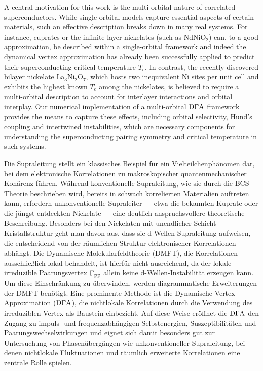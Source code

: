 \documentclass[../../main.tex]{subfiles}
\begin{document}
A central motivation for this work is the multi-orbital nature of correlated superconductors. While single-orbital models capture essential aspects of certain materials, such an effective description breaks down in many real systems. For instance, cuprates or the infinite-layer nickelates (such as NdNiO$_2$) can, to a good approximation, be described within a single-orbital framework and indeed the dynamical vertex approximation has already been successfully applied to predict their superconducting critical temperature $T_{\mathrm{c}}$. In contrast, the recently discovered bilayer nickelate La$_3$Ni$_2$O$_7$, which hosts two inequivalent Ni sites per unit cell and exhibits the highest known $T_{\mathrm{c}}$ among the nickelates, is believed to require a multi-orbital description to account for interlayer interactions and orbital interplay. Our numerical implementation of a multi-orbital $\text{D}\Gamma\text{A}$ framework provides the means to capture these effects, including orbital selectivity, Hund's coupling and intertwined instabilities, which are necessary components for understanding the superconducting pairing symmetry and critical temperature in such systems.

\newpage
{}
\vspace{1.4cm}

Die Supraleitung stellt ein klassisches Beispiel für ein Vielteilchenphänomen dar, bei dem elektronische Korrelationen zu makroskopischer quantenmechanischer Kohärenz führen. Während konventionelle Supraleitung, wie sie durch die BCS-Theorie beschrieben wird, bereits in schwach korrelierten Materialien auftreten kann, erfordern unkonventionelle Supraleiter --- etwa die bekannten Kuprate oder die jüngst entdeckten Nickelate --- eine deutlich anspruchsvollere theoretische Beschreibung. Besonders bei den Nickelaten mit unendlicher Schicht-Kristallstruktur geht man davon aus, dass sie d-Wellen-Supraleitung aufweisen, die entscheidend von der räumlichen Struktur elektronischer Korrelationen abhängt. Die Dynamische Molekularfeldtheorie (DMFT), die Korrelationen ausschließlich lokal behandelt, ist hierfür nicht ausreichend, da der lokale irreduzible Paarungsvertex $\Gamma_{\text{pp}}$ allein keine d-Wellen-Instabilität erzeugen kann. Um diese Einschränkung zu überwinden, werden diagrammatische Erweiterungen der DMFT benötigt. Eine prominente Methode ist die Dynamische Vertex Approximation ($\text{D}\Gamma\text{A}$), die nichtlokale Korrelationen durch die Verwendung des irreduziblen Vertex als Baustein einbezieht. Auf diese Weise eröffnet die $\text{D}\Gamma\text{A}$ den Zugang zu impuls- und frequenzabhängigen Selbstenergien, Suszeptibilitäten und Paarungswechselwirkungen und eignet sich damit besonders gut zur Untersuchung von Phasenübergängen wie unkonventioneller Supraleitung, bei denen nichtlokale Fluktuationen und räumlich erweiterte Korrelationen eine zentrale Rolle spielen.
\newline
\end{document}
